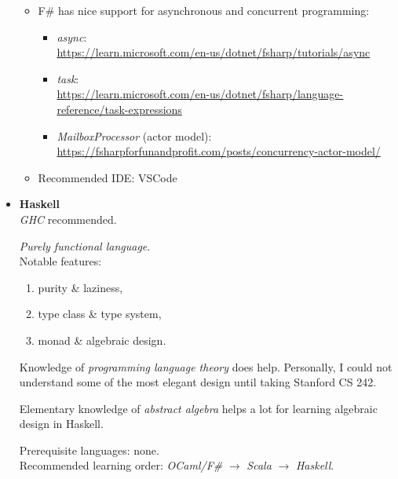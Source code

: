 \documentclass{article}
\begin{document}
\begin{itemize}
\begin{itemize}
\begin{enumerate}
        \end{enumerate}
        \item F\# has nice support for asynchronous and concurrent programming:
        \begin{itemize}
            \item \emph{async}:\\
            \href{https://learn.microsoft.com/en-us/dotnet/fsharp/tutorials/async}{https://learn.microsoft.com/en-us/dotnet/fsharp/tutorials/async}
            \item \emph{task}:\\
            \href{https://learn.microsoft.com/en-us/dotnet/fsharp/language-reference/task-expressions}{https://learn.microsoft.com/en-us/dotnet/fsharp/language-reference/task-expressions}
            \item \emph{MailboxProcessor} (actor model):\\
            \href{https://fsharpforfunandprofit.com/posts/concurrency-actor-model/}{https://fsharpforfunandprofit.com/posts/concurrency-actor-model/}
        \end{itemize}
        \item Recommended IDE: VSCode
    \end{itemize}

    \item \textbf{Haskell}\\
    \emph{GHC} recommended.
    
    \emph{Purely functional language}.\\

    Notable features:
    \begin{enumerate}
        \item purity \& laziness,
        \item type class \& type system,
        \item monad \& algebraic design.
    \end{enumerate}
    
    Knowledge of \emph{programming language theory} does help. Personally, I could not understand some of the most elegant design until taking Stanford CS 242.

    Elementary knowledge of \emph{abstract algebra} helps a lot for learning algebraic design in Haskell.
    
    Prerequisite languages: none.\\
    Recommended learning order:
    \emph{OCaml/F\#} $\rightarrow$ \emph{Scala} $\rightarrow$ \emph{Haskell}.
    

\end{itemize}
\end{document}
